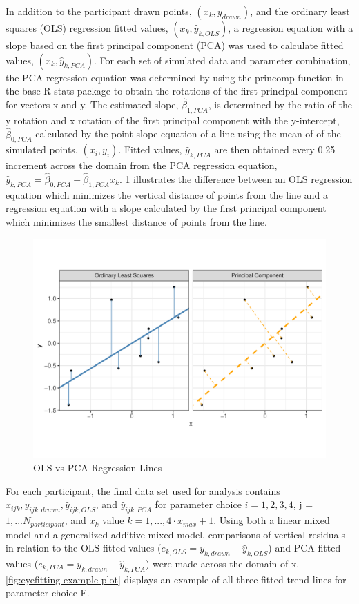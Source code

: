 \documentclass[print]{nuthesis}
\begin{document}
In addition to the participant drawn points, \((x_k, y_{drawn})\), and the ordinary least squares (OLS) regression fitted values, \((x_k, \hat y_{k,OLS})\), a regression equation with a slope based on the first principal component (PCA) was used to calculate fitted values, \((x_k, \hat y_{k,PCA})\).
For each set of simulated data and parameter combination, the PCA regression equation was determined by using the princomp function in the base R stats package to obtain the rotations of the first principal component for vectors x and y.
The estimated slope, \(\hat\beta_{1,PCA}\), is determined by the ratio of the y rotation and x rotation of the first principal component with the y-intercept, \(\hat\beta_{0,PCA}\) calculated by the point-slope equation of a line using the mean of of the simulated points, \((\bar x_i, \bar y_i)\).
Fitted values, \(\hat y_{k,PCA}\) are then obtained every 0.25 increment across the domain from the PCA regression equation, \(\hat y_{k,PCA} = \hat\beta_{0,PCA} + \hat\beta_{1,PCA} x_k\).
\cref{fig:ols-vs-pca-example} illustrates the difference between an OLS regression equation which minimizes the vertical distance of points from the line and a regression equation with a slope calculated by the first principal component which minimizes the smallest distance of points from the line.

\begin{figure}[tbp]

{\centering \includegraphics[width=0.65\linewidth,]{thesis_files/figure-latex/ols-vs-pca-example-1} 

}

\caption{OLS vs PCA Regression Lines}\label{fig:ols-vs-pca-example}
\end{figure}

For each participant, the final data set used for analysis contains \(x_{ijk}, y_{ijk,drawn}, \hat y_{ijk,OLS}\), and \(\hat y_{ijk,PCA}\) for parameter choice \(i = 1,2,3,4\), j = \(1,...N_{participant}\), and \(x_{k}\) value \(k = 1, ...,4\cdot x_{max} + 1\).
Using both a linear mixed model and a generalized additive mixed model, comparisons of vertical residuals in relation to the OLS fitted values (\(e_{k,OLS} = y_{k,drawn} - \hat y_{k,OLS}\)) and PCA fitted values (\(e_{k,PCA} = y_{k,drawn} - \hat y_{k,PCA}\)) were made across the domain of x.
\cref{fig:eyefitting-example-plot} displays an example of all three fitted trend lines for parameter choice F.
\end{document}
